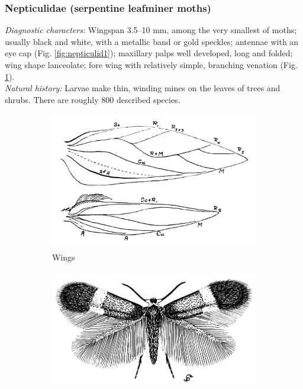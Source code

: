 \documentclass[letterpaper, 11pt]{article}
\begin{document}
\subsubsection{Nepticulidae (serpentine leafminer moths)}
\noindent{}\textit{Diagnostic characters:} Wingspan 3.5--10 mm, among the very smallest of moths; usually black and white, with a metallic band or gold speckles; antennae with an eye cap (Fig. \ref{fig:nepticulid1}); maxillary palps well developed, long and folded; wing shape lanceolate; fore wing with relatively simple, branching venation (Fig. \ref{fig:nepticulid2}).\\

\noindent{}\textit{Natural history:} Larvae make thin, winding mines on the leaves of trees and shrubs. There are roughly 800 described species.

\begin{figure}[ht!]
    \centering
    \begin{subfigure}[ht!]{0.42\textwidth}
        \includegraphics[width=\textwidth]{NepticulidWings}
        \caption{Wings \citep[][Fig. 1]{braun1917nepticulids}}
        \label{fig:nepticulid2}
    \end{subfigure}
    \hfill %
    \begin{subfigure}[ht!]{0.45\textwidth}
        \includegraphics[width=\textwidth]{nepticulidHabitus.png}

\end{subfigure}
\end{figure}
\end{document}
